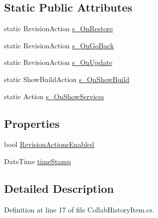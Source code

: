 \subsection*{Static Public Attributes}
\begin{DoxyCompactItemize}
\item 
static Revision\+Action \mbox{\hyperlink{class_unity_editor_1_1_collaboration_1_1_collab_history_item_a611b29e426e89f88e0ef2912f0c00a3b}{s\+\_\+\+On\+Restore}}
\item 
static Revision\+Action \mbox{\hyperlink{class_unity_editor_1_1_collaboration_1_1_collab_history_item_aa4e10c99eb580749cd5a09e24ba73ddc}{s\+\_\+\+On\+Go\+Back}}
\item 
static Revision\+Action \mbox{\hyperlink{class_unity_editor_1_1_collaboration_1_1_collab_history_item_aa6ebbd9cb61bc7c87744da31fd0f811b}{s\+\_\+\+On\+Update}}
\item 
static Show\+Build\+Action \mbox{\hyperlink{class_unity_editor_1_1_collaboration_1_1_collab_history_item_a7cca2902c20361359e73939c38793869}{s\+\_\+\+On\+Show\+Build}}
\item 
static Action \mbox{\hyperlink{class_unity_editor_1_1_collaboration_1_1_collab_history_item_a7f081c104fab7cb3794d9e0eea69e1f4}{s\+\_\+\+On\+Show\+Services}}
\end{DoxyCompactItemize}
\subsection*{Properties}
\begin{DoxyCompactItemize}
\item 
bool \mbox{\hyperlink{class_unity_editor_1_1_collaboration_1_1_collab_history_item_a7f0d37abb3de32fec8b5b6ce53e4eedc}{Revision\+Actions\+Enabled}}
\item 
Date\+Time \mbox{\hyperlink{class_unity_editor_1_1_collaboration_1_1_collab_history_item_af1e6d8e67a2c5a071fb8624d404aea11}{time\+Stamp}}
\end{DoxyCompactItemize}


\subsection{Detailed Description}


Definition at line 17 of file Collab\+History\+Item.\+cs.



